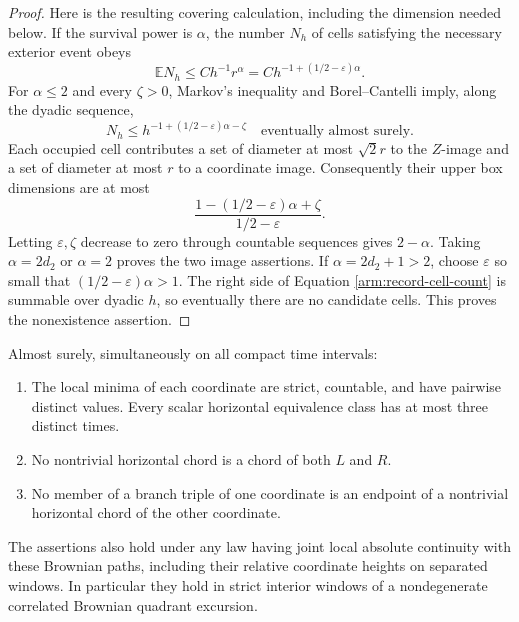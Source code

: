 \begin{proof}
Here is the resulting covering calculation, including the dimension
needed below.  If the survival power is $\alpha$, the number $N_h$ of
cells satisfying the necessary exterior event obeys
\begin{equation}\label{arm:record-cell-count}
 \mathbb E N_h\le C h^{-1}r^\alpha
          =C h^{-1+(1/2-\varepsilon)\alpha}.
\end{equation}
For $\alpha\le2$ and every $\zeta>0$, Markov's inequality and
Borel--Cantelli imply, along the dyadic sequence,
\[
 N_h\le h^{-1+(1/2-\varepsilon)\alpha-\zeta}
 \quad\text{eventually almost surely}.
\]
Each occupied cell contributes a set of diameter at most $\sqrt2r$ to
the $Z$-image and a set of diameter at most $r$ to a coordinate image.
Consequently their upper box dimensions are at most
\[
 \frac{1-(1/2-\varepsilon)\alpha+\zeta}
      {1/2-\varepsilon}.
\]
Letting $\varepsilon,\zeta$ decrease to zero through countable sequences
gives $2-\alpha$.  Taking $\alpha=2d_2$ or $\alpha=2$ proves the two
image assertions.  If $\alpha=2d_2+1>2$, choose $\varepsilon$ so small
that $(1/2-\varepsilon)\alpha>1$.  The right side of Equation
\eqref{arm:record-cell-count} is summable over dyadic $h$, so eventually
there are no candidate cells.  This proves the nonexistence assertion.
\end{proof}

\begin{lemma}\label{arm:generic-chords}
Almost surely, simultaneously on all compact time intervals:
\begin{enumerate}[label=\textup{(\roman*)}]
 \item The local minima of each coordinate are strict, countable, and
 have pairwise distinct values.  Every scalar horizontal equivalence
 class has at most three distinct times.
 \item No nontrivial horizontal chord is a chord of both $L$ and $R$.
 \item No member of a branch triple of one coordinate is an endpoint
 of a nontrivial horizontal chord of the other coordinate.
\end{enumerate}
The assertions also hold under any law having joint local absolute
continuity with these Brownian paths, including their relative coordinate
heights on separated windows.  In particular they hold in strict interior
windows of a nondegenerate correlated Brownian quadrant excursion.
\end{lemma}

